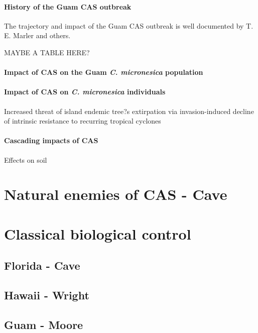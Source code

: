 \documentclass[12pt,letterpaper,english,bibliography=totocnumbered, abstract=on]{scrartcl}
\begin{document}
\paragraph{History of the Guam CAS outbreak}

The trajectory and impact of the Guam CAS outbreak is well documented by T. E. Marler and others.

MAYBE A TABLE HERE?

\paragraph{Impact of CAS on the Guam \textit{C. micronesica} population}

\paragraph{Impact of CAS on \textit{C. micronesica} individuals}

Increased threat of island endemic tree?s
extirpation via invasion-induced decline of
intrinsic resistance to recurring tropical cyclones

\paragraph{Cascading impacts of CAS}

Effects on soil \cite{marlerTwoCycadSpecies2020}


\cite{haynesExoticInvasivePest2005}



\section{Natural enemies of CAS - Cave}

\section{Classical biological control}

\subsection{Florida - Cave}

\subsection{Hawaii - Wright}

\subsection{Guam - Moore}
\end{document}

